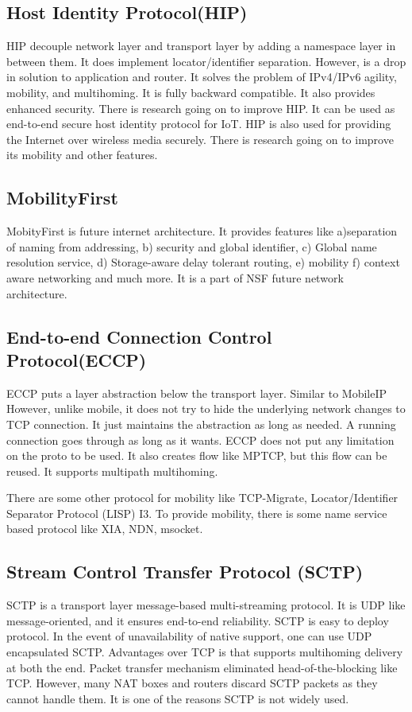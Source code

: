 \subsection{Host Identity Protocol(HIP)}
HIP\cite{HIP} decouple network layer and transport layer by adding a namespace layer in between them. It does implement locator/identifier separation. However, is a drop in solution to application and router. It solves the problem of IPv4/IPv6 agility, mobility, and multihoming. It is fully backward compatible. It also provides enhanced security. There is research going on to improve HIP. It can be used as end-to-end secure host identity protocol for IoT\cite{HIPIoT}. HIP is also used for providing the Internet over wireless media securely\cite{HIPPubliceWifi}. There is research going on to improve its mobility and other features\cite{HIPMobility,HIPMobilityEnhanced,HIPMobilitySimulte}.

\subsection{MobilityFirst}
MobityFirst is future internet architecture. It provides features like a)separation of naming from addressing, b) security and global identifier, c) Global name resolution service, d) Storage-aware delay tolerant routing, e) mobility f) context aware networking\cite{MobilityFirstContextAwareDemo} and much more. It is a part of NSF future network architecture.


\subsection{End-to-end Connection Control Protocol(ECCP)}
ECCP\cite{ECCP} puts a layer abstraction below the transport layer. Similar to MobileIP However, unlike mobile, it does not try to hide the underlying network changes to TCP connection. It just maintains the abstraction as long as needed. A running connection goes through as long as it wants. ECCP does not put any limitation on the proto to be used. It also creates flow like MPTCP, but this flow can be reused. It supports multipath multihoming. 

There are some other protocol for mobility like TCP-Migrate, Locator/Identifier Separator Protocol (LISP)\cite{LISPRFC6830} I3\cite{I3-internet-indirection-infrastructure}. To provide mobility, there is some name service based protocol like XIA\cite{XIA}, NDN\cite{ndn}, msocket\cite{Yadav2016}.

\subsection{Stream Control Transfer Protocol (SCTP)}
SCTP\cite{RFC4960} is a transport layer message-based multi-streaming protocol. It is UDP like message-oriented, and it ensures end-to-end reliability. SCTP is easy to deploy protocol. In the event of unavailability of native support, one can use UDP encapsulated SCTP\cite{6951}. Advantages over TCP is that supports multihoming delivery at both the end. Packet transfer mechanism eliminated head-of-the-blocking like TCP. However, many NAT boxes and routers discard SCTP packets as they cannot handle them. It is one of the reasons SCTP is not widely used.

